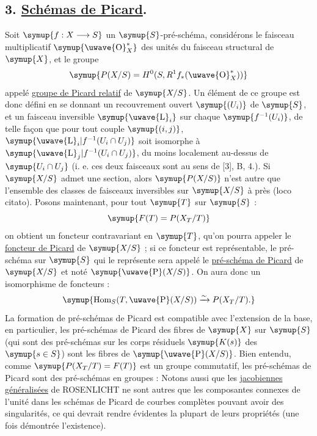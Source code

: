 \subsection*{\textnormal{3. \uline{Schémas de Picard}.}}

Soit $\symup{f:X\longrightarrow S}$ un $\symup{S}$-pré-schéma, considérons le faisceau
multiplicatif $\symup{\text{\uwave{O}}_X^*}$ des unités du faisceau structural de $\symup{X}$, et le
groupe
\[
  \symup{P(X/S)=H^0(S,R^1f_*(\text{\uwave{O}}_X^*))}
\]
appelé \uline{groupe de Picard relatif} de $\symup{X/S}$. Un élément de ce groupe est donc
défini en se donnant un recouvrement ouvert $\symup{(U_i)}$ de $\symup{S}$, et un faisceau
inversible $\symup{\text{\uwave{L}}_i}$ sur chaque $\symup{f^{-1}(U_i)}$, de telle façon que pour tout couple
$\symup{(i,j)}$, $\symup{\text{\uwave{L}}_i|f^{-1}(U_i\cap U_j)}$ soit isomorphe à
$\symup{\text{\uwave{L}}_j|f^{-1}(U_i\cap U_j)}$, du moins localement au-dessus de $\symup{U_i\cap U_j}$
(i. e. ces deux faisceaux sont  au sens de [3], B, 4.). Si $\symup{X/S}$
admet une section, alors $\symup{P(X/S)}$ n'est autre que l'ensemble des classes de
faisceaux inversibles sur $\symup{X/S}$ à  près (loco citato). Posons
maintenant, pour tout $\symup{T}$ sur $\symup{S}$ :
\[
  \symup{F(T)=P(X_T/T)}
\]
on obtient un foncteur contravariant en $\symup{T}$, qu'on pourra appeler le \uline{foncteur de
Picard} de $\symup{X/S}$ ; si ce foncteur est représentable, le pré-schéma sur $\symup{S}$ qui
le représente sera appelé le \uline{pré-schéma de Picard} de $\symup{X/S}$ et noté
$\symup{\text{\uwave{P}}(X/S)}$. On aura donc un isomorphisme de foncteurs :
\[
  \symup{\operatorname{Hom}_S(T,\text{\uwave{P}}(X/S))
  \xrightarrow{\sim}P(X_T/T).}
\]
La formation de pré-schémas de Picard est compatible avec l'extension de la
base, en particulier, les pré-schémas de Picard des fibres de $\symup{X}$ sur $\symup{S}$ (qui
sont des pré-schémas sur les corps résiduels $\symup{K(s)}$ des $\symup{s\in S}$) sont les
fibres
de $\symup{\text{\uwave{P}}(X/S)}$. Bien entendu, comme $\symup{P(X_T/T)=F(T)}$ est un
groupe commutatif, les pré-schémas de Picard sont des pré-schémas en groupes :
Notons aussi que les \uline{jacobiennes généralisées} de ROSENLICHT ne sont autres que
les composantes connexes de l'unité dans les schémas de Picard de courbes
complètes pouvant avoir des singularités, ce qui devrait rendre évidentes la
plupart de leurs propriétés (une fois démontrée l'existence).

